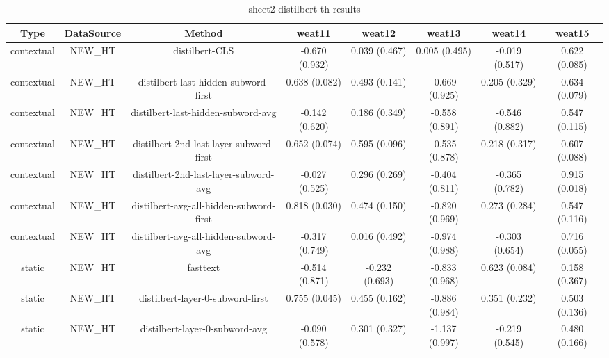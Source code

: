 \begin{sidewaystable}[htb]
    \centering
    \caption{sheet2 distilbert th results}
    \label{appendix_tab:sheet2_distilbert_th_results}
    \small
    \begin{tabular}{@{}cccccccc@{}}
        \toprule
        Type & DataSource & Method & weat11 & weat12 & weat13 & weat14 & weat15 \\
        \midrule
        contextual & NEW\_HT & distilbert-CLS & -0.670 (0.932) & 0.039 (0.467) & 0.005 (0.495) & -0.019 (0.517) & 0.622 (0.085) \\
        contextual & NEW\_HT & distilbert-last-hidden-subword-first & 0.638 (0.082) & 0.493 (0.141) & -0.669 (0.925) & 0.205 (0.329) & 0.634 (0.079) \\
        contextual & NEW\_HT & distilbert-last-hidden-subword-avg & -0.142 (0.620) & 0.186 (0.349) & -0.558 (0.891) & -0.546 (0.882) & 0.547 (0.115) \\
        contextual & NEW\_HT & distilbert-2nd-last-layer-subword-first & 0.652 (0.074) & 0.595 (0.096) & -0.535 (0.878) & 0.218 (0.317) & 0.607 (0.088) \\
        contextual & NEW\_HT & distilbert-2nd-last-layer-subword-avg & -0.027 (0.525) & 0.296 (0.269) & -0.404 (0.811) & -0.365 (0.782) & 0.915 (0.018) \\
        contextual & NEW\_HT & distilbert-avg-all-hidden-subword-first & 0.818 (0.030) & 0.474 (0.150) & -0.820 (0.969) & 0.273 (0.284) & 0.547 (0.116) \\
        contextual & NEW\_HT & distilbert-avg-all-hidden-subword-avg & -0.317 (0.749) & 0.016 (0.492) & -0.974 (0.988) & -0.303 (0.654) & 0.716 (0.055) \\
        static & NEW\_HT & fasttext & -0.514 (0.871) & -0.232 (0.693) & -0.833 (0.968) & 0.623 (0.084) & 0.158 (0.367) \\
        static & NEW\_HT & distilbert-layer-0-subword-first & 0.755 (0.045) & 0.455 (0.162) & -0.886 (0.984) & 0.351 (0.232) & 0.503 (0.136) \\
        static & NEW\_HT & distilbert-layer-0-subword-avg & -0.090 (0.578) & 0.301 (0.327) & -1.137 (0.997) & -0.219 (0.545) & 0.480 (0.166) \\
        \bottomrule
    \end{tabular}
\end{sidewaystable}